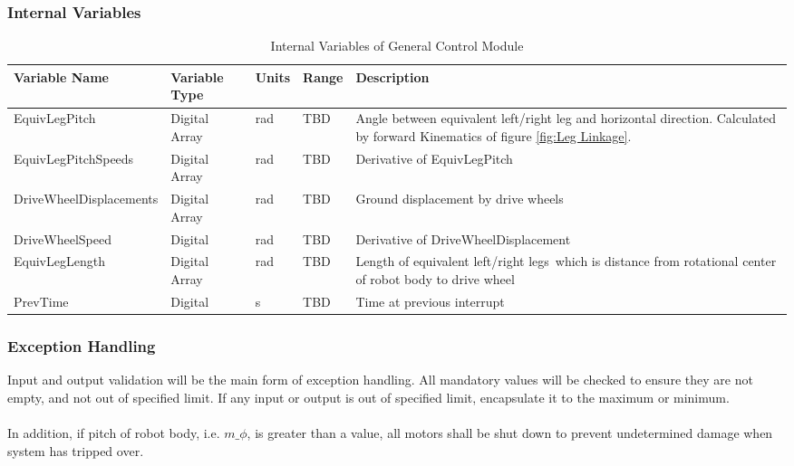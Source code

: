 \documentclass[12pt]{article}
\begin{document}
        \subsubsection{Internal Variables}
            \begin{table}[H]
              \centering
                \caption{Internal Variables of General Control Module} \label{tbl:Internal Variables of General Control Module}
              \begin{tabularx}{\textwidth}{|p{5.5cm}|p{1.5cm}|p{1.2cm}|p{2cm}|X|}
                \hline Variable Name & Variable Type & Units & Range & Description \\
                \hline EquivLegPitch & Digital Array & rad & TBD & Angle between equivalent left/right leg and horizontal direction. Calculated by forward Kinematics of figure \ref{fig:Leg Linkage}.\\
                \hline EquivLegPitchSpeeds & Digital Array & rad & TBD & Derivative of EquivLegPitch\\
                \hline DriveWheelDisplacements & Digital Array & rad & TBD & Ground displacement by drive wheels\\
                \hline DriveWheelSpeed & Digital & rad & TBD & Derivative of DriveWheelDisplacement\\
                \hline EquivLegLength & Digital Array & rad & TBD & Length of equivalent left/right legs\, which is distance from rotational center of robot body to drive wheel\\
                \hline PrevTime & Digital & s & TBD & Time at previous interrupt\\
                \hline
              \end{tabularx}
            \end{table}
            
        \subsubsection{Exception Handling}
            Input and output validation will be the main form of exception handling. All mandatory values will be checked to ensure they are not empty, and not out of specified limit. If any input or output is out of specified limit, encapsulate it to the maximum or minimum.\\\\
            In addition, if pitch of robot body, i.e. $m\_\phi$, is greater than a value, all motors shall be shut down to prevent undetermined damage when system has tripped over.
\end{document}
